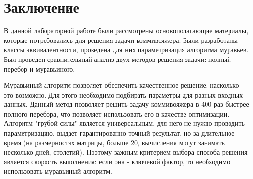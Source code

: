 \chapter*{Заключение}
В данной лабораторной работе были рассмотрены основополагающие материалы, которые потребовались для решения задачи коммивояжера. Были разработаны классы эквивалентности, проведена для них параметризация алгоритма муравьев. Был проведен сравнительный анализ двух методов решения задачи: полный перебор и муравьиного.

Муравьиный алгоритм позволяет обеспечить качественное решение, насколько это возможно. Для этого необходимо подбирать параметры для разных входных данных. Данный метод позволяет решить задачу коммивояжера в 400 раз быстрее полного перебора, что позволяет использовать его в качестве оптимизации. Алгоритм "грубой силы" является универсальным, для него не нужно проводить параметризацию, выдает гарантированно точный результат, но за длительное время (на размерностях матрицы, больше 20, вычисления могут занимать несколько дней, столетий). Поэтому важным критерием выбора способа решения является скорость выполнения: если она - ключевой фактор, то необходимо использовать муравьиный алгоритм.